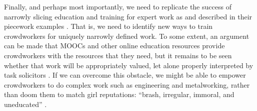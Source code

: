 \documentclass[trackingWork]{subfiles}
\begin{document}
Finally, and perhaps most importantly,
we need to replicate the success of narrowly slicing education and training for expert work
as \citeauthor{hart2013rise} and \citeauthor{grier2013computers} described in their piecework examples
\cite{hart2013rise,grier2013computers} .
That is, we need to identify new ways to train crowdworkers for uniquely narrowly defined work. 
To some extent, an argument can be made that
MOOCs and other online education resources
provide crowdworkers with the resources that they need, but 
it remains to be seen whether that work will be appropriately valued, let alone
properly interpreted by task solicitors
\cite{aguaded2013mooc}.
If we can overcome this obstacle,
we might be able to empower crowdworkers to do complex work such as engineering and metalworking,
rather than doom them to match girl reputations:
``brash, irregular, immoral, and uneducated''
\cite{10.2307/3827491}. 







\onlyinsubfile{
  \balance{}
  \printbibliography
  \nobalance{}
  }


\end{document}
